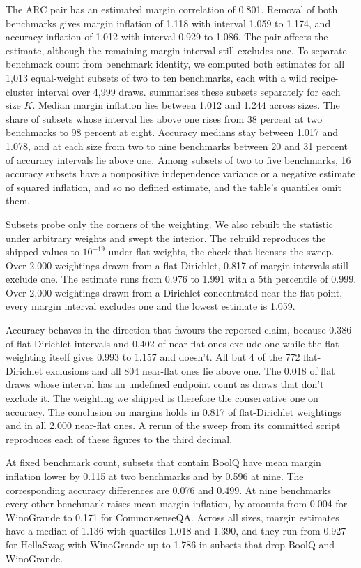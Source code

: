 The ARC pair has an estimated margin correlation of 0.801. Removal of both benchmarks gives margin inflation of 1.118 with interval 1.059 to 1.174, and accuracy inflation of 1.012 with interval 0.929 to 1.086. The pair affects the estimate, although the remaining margin interval still excludes one.
\label{app:composition}
To separate benchmark count from benchmark identity, we computed both estimates for all 1,013 equal-weight subsets of two to ten benchmarks, each with a wild recipe-cluster interval over 4,999 draws.  summarises these subsets separately for each size $K$. Median margin inflation lies between 1.012 and 1.244 across sizes. The share of subsets whose interval lies above one rises from 38 percent at two benchmarks to 98 percent at eight. Accuracy medians stay between 1.017 and 1.078, and at each size from two to nine benchmarks between 20 and 31 percent of accuracy intervals lie above one. Among subsets of two to five benchmarks, 16 accuracy subsets have a nonpositive independence variance or a negative estimate of squared inflation, and so no defined estimate, and the table's quantiles omit them.

Subsets probe only the corners of the weighting. We also rebuilt the statistic under arbitrary weights and swept the interior. The rebuild reproduces the shipped values to $10^{-19}$ under flat weights, the check that licenses the sweep. Over 2,000 weightings drawn from a flat Dirichlet, 0.817 of margin intervals still exclude one. The estimate runs from 0.976 to 1.991 with a 5th percentile of 0.999. Over 2,000 weightings drawn from a Dirichlet concentrated near the flat point, every margin interval excludes one and the lowest estimate is 1.059.

Accuracy behaves in the direction that favours the reported claim, because 0.386 of flat-Dirichlet intervals and 0.402 of near-flat ones exclude one while the flat weighting itself gives 0.993 to 1.157 and doesn't. All but 4 of the 772 flat-Dirichlet exclusions and all 804 near-flat ones lie above one. The 0.018 of flat draws whose interval has an undefined endpoint count as draws that don't exclude it. The weighting we shipped is therefore the conservative one on accuracy. The conclusion on margins holds in 0.817 of flat-Dirichlet weightings and in all 2,000 near-flat ones. A rerun of the sweep from its committed script reproduces each of these figures to the third decimal.

At fixed benchmark count, subsets that contain BoolQ have mean margin inflation lower by 0.115 at two benchmarks and by 0.596 at nine. The corresponding accuracy differences are 0.076 and 0.499. At nine benchmarks every other benchmark raises mean margin inflation, by amounts from 0.004 for WinoGrande to 0.171 for CommonsenseQA. Across all sizes, margin estimates have a median of 1.136 with quartiles 1.018 and 1.390, and they run from 0.927 for HellaSwag with WinoGrande up to 1.786 in subsets that drop BoolQ and WinoGrande.

